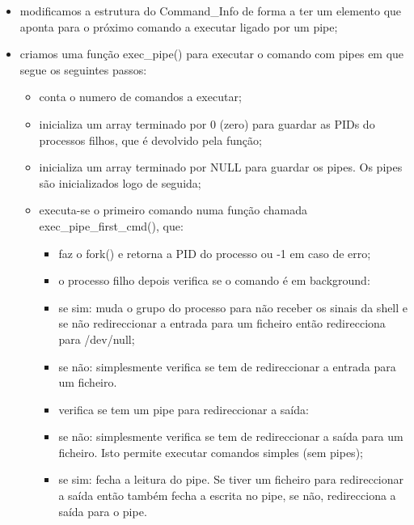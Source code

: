 \documentclass[11pt]{article}
\begin{document}
\begin{itemize}

	\item modificamos a estrutura do Command\_Info de forma a ter um elemento que aponta para o próximo comando a executar ligado por um pipe;

	\item criamos uma função exec\_pipe() para executar o comando com pipes em que segue os seguintes passos:

	\begin{itemize}

		\item conta o numero de comandos a executar;
		
		\item inicializa um array terminado por 0 (zero) para guardar as PIDs do processos filhos, que é devolvido pela função;
		
		\item inicializa um array terminado por NULL para guardar os pipes. Os pipes são inicializados logo de seguida;
		
		\item executa-se o primeiro comando numa função chamada exec\_pipe\_first\_cmd(), que:
		
		\begin{itemize}
		
			\item faz o fork() e retorna a PID do processo ou -1 em caso de erro;
			
			\item o processo filho depois verifica se o comando é em background:
			
			\item se sim: muda o grupo do processo para não receber os sinais da shell e se não redireccionar a entrada para um ficheiro então redirecciona para /dev/null;
			
			\item se não: simplesmente verifica se tem de redireccionar a entrada para um ficheiro.
			
			\item verifica se tem um pipe para redireccionar a saída:
			
			\item se não: simplesmente verifica se tem de redireccionar a saída para um ficheiro. Isto permite executar comandos simples (sem pipes);
			
			\item se sim: fecha a leitura do pipe. Se tiver um ficheiro para redireccionar a saída então também fecha a escrita no pipe, se não, redirecciona a saída para o pipe.
			

\end{itemize}
\end{itemize}
\end{itemize}
\end{document}
